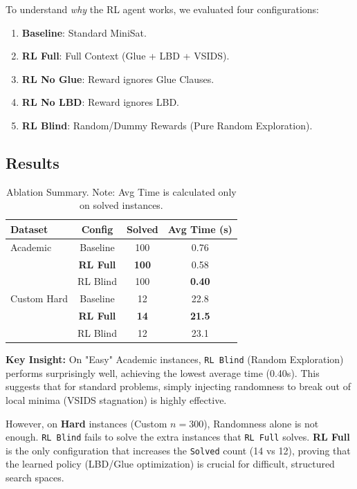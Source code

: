 \documentclass{article}
\begin{document}
To understand \textit{why} the RL agent works, we evaluated four configurations:
\begin{enumerate}
    \item \textbf{Baseline}: Standard MiniSat.
    \item \textbf{RL Full}: Full Context (Glue + LBD + VSIDS).
    \item \textbf{RL No Glue}: Reward ignores Glue Clauses.
    \item \textbf{RL No LBD}: Reward ignores LBD.
    \item \textbf{RL Blind}: Random/Dummy Rewards (Pure Random Exploration).
\end{enumerate}

\subsection{Results}

\begin{table}[h]
    \centering
    \begin{tabular}{lccc}
        \toprule
        \textbf{Dataset} & \textbf{Config} & \textbf{Solved} & \textbf{Avg Time (s)} \\
        \midrule
        Academic & Baseline & 100 & 0.76 \\
         & \textbf{RL Full} & \textbf{100} & 0.58 \\
         & RL Blind & 100 & \textbf{0.40} \\
        \midrule
        Custom Hard & Baseline & 12 & 22.8 \\
         & \textbf{RL Full} & \textbf{14} & \textbf{21.5} \\
         & RL Blind & 12 & 23.1 \\
        \bottomrule
    \end{tabular}
    \caption{Ablation Summary. Note: Avg Time is calculated only on solved instances.}
    \label{tab:ablation}
\end{table}

\textbf{Key Insight:}
On "Easy" Academic instances, \texttt{RL Blind} (Random Exploration) performs surprisingly well, achieving the lowest average time (0.40s). This suggests that for standard problems, simply injecting randomness to break out of local minima (VSIDS stagnation) is highly effective.

However, on \textbf{Hard} instances (Custom $n=300$), Randomness alone is not enough. \texttt{RL Blind} fails to solve the extra instances that \texttt{RL Full} solves. \textbf{RL Full} is the only configuration that increases the \texttt{Solved} count (14 vs 12), proving that the learned policy (LBD/Glue optimization) is crucial for difficult, structured search spaces.
\end{document}
